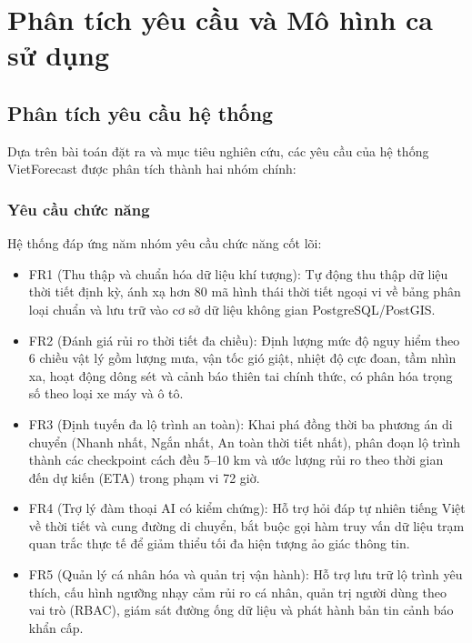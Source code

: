 \section{Phân tích yêu cầu và Mô hình ca sử dụng}

\subsection{Phân tích yêu cầu hệ thống}
Dựa trên bài toán đặt ra và mục tiêu nghiên cứu, các yêu cầu của hệ thống VietForecast được phân tích thành hai nhóm chính:

\subsubsection{Yêu cầu chức năng}
Hệ thống đáp ứng năm nhóm yêu cầu chức năng cốt lõi:
\begin{itemize}
    \item FR1 (Thu thập và chuẩn hóa dữ liệu khí tượng): Tự động thu thập dữ liệu thời tiết định kỳ, ánh xạ hơn 80 mã hình thái thời tiết ngoại vi về bảng phân loại chuẩn và lưu trữ vào cơ sở dữ liệu không gian PostgreSQL/PostGIS.
    \item FR2 (Đánh giá rủi ro thời tiết đa chiều): Định lượng mức độ nguy hiểm theo 6 chiều vật lý gồm lượng mưa, vận tốc gió giật, nhiệt độ cực đoan, tầm nhìn xa, hoạt động dông sét và cảnh báo thiên tai chính thức, có phân hóa trọng số theo loại xe máy và ô tô.
    \item FR3 (Định tuyến đa lộ trình an toàn): Khai phá đồng thời ba phương án di chuyển (Nhanh nhất, Ngắn nhất, An toàn thời tiết nhất), phân đoạn lộ trình thành các checkpoint cách đều 5--10 km và ước lượng rủi ro theo thời gian đến dự kiến (ETA) trong phạm vi 72 giờ.
    \item FR4 (Trợ lý đàm thoại AI có kiểm chứng): Hỗ trợ hỏi đáp tự nhiên tiếng Việt về thời tiết và cung đường di chuyển, bắt buộc gọi hàm truy vấn dữ liệu trạm quan trắc thực tế để giảm thiểu tối đa hiện tượng ảo giác thông tin.
    \item FR5 (Quản lý cá nhân hóa và quản trị vận hành): Hỗ trợ lưu trữ lộ trình yêu thích, cấu hình ngưỡng nhạy cảm rủi ro cá nhân, quản trị người dùng theo vai trò (RBAC), giám sát đường ống dữ liệu và phát hành bản tin cảnh báo khẩn cấp.
\end{itemize}

